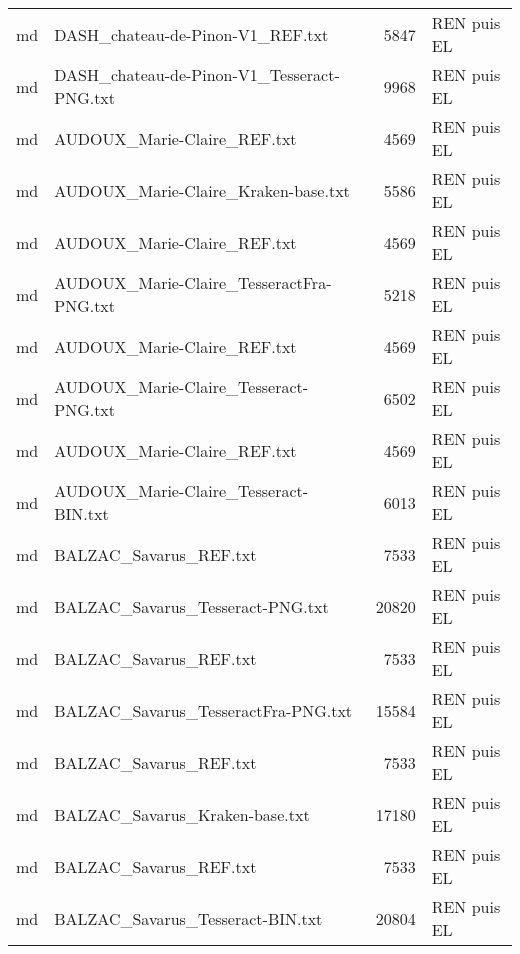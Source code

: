\begin{tabular}{llrl}
    md &                   DASH\_chateau-de-Pinon-V1\_REF.txt &                  5847 & REN puis EL \\
    md &         DASH\_chateau-de-Pinon-V1\_Tesseract-PNG.txt &                  9968 & REN puis EL \\
    md &                        AUDOUX\_Marie-Claire\_REF.txt &                  4569 & REN puis EL \\
    md &                AUDOUX\_Marie-Claire\_Kraken-base.txt &                  5586 & REN puis EL \\
    md &                        AUDOUX\_Marie-Claire\_REF.txt &                  4569 & REN puis EL \\
    md &           AUDOUX\_Marie-Claire\_TesseractFra-PNG.txt &                  5218 & REN puis EL \\
    md &                        AUDOUX\_Marie-Claire\_REF.txt &                  4569 & REN puis EL \\
    md &              AUDOUX\_Marie-Claire\_Tesseract-PNG.txt &                  6502 & REN puis EL \\
    md &                        AUDOUX\_Marie-Claire\_REF.txt &                  4569 & REN puis EL \\
    md &              AUDOUX\_Marie-Claire\_Tesseract-BIN.txt &                  6013 & REN puis EL \\
    md &                             BALZAC\_Savarus\_REF.txt &                  7533 & REN puis EL \\
    md &                   BALZAC\_Savarus\_Tesseract-PNG.txt &                 20820 & REN puis EL \\
    md &                             BALZAC\_Savarus\_REF.txt &                  7533 & REN puis EL \\
    md &                BALZAC\_Savarus\_TesseractFra-PNG.txt &                 15584 & REN puis EL \\
    md &                             BALZAC\_Savarus\_REF.txt &                  7533 & REN puis EL \\
    md &                     BALZAC\_Savarus\_Kraken-base.txt &                 17180 & REN puis EL \\
    md &                             BALZAC\_Savarus\_REF.txt &                  7533 & REN puis EL \\
    md &                   BALZAC\_Savarus\_Tesseract-BIN.txt &                 20804 & REN puis EL \\
\bottomrule
\end{tabular}

